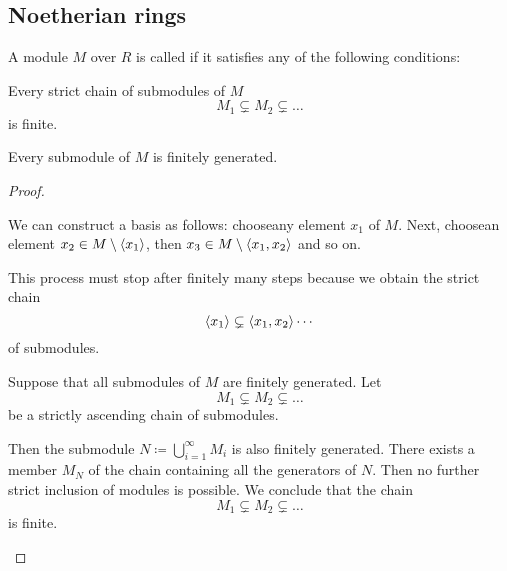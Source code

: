 \subsection{Noetherian rings}\label{subsec:noetherian_rings}

\begin{definition}\label{def:noetherian_module}\cite[proposition 8.30]{Knapp2016BAlg}
  A module \( M \) over \( R \) is called  if it satisfies any of the following conditions:
  \begin{defenum}
     Every strict chain of submodules of \( M \)
    \begin{equation*}
      M_1 \subsetneq M_2 \subsetneq \ldots
    \end{equation*}
    is finite.

     Every submodule of \( M \) is finitely generated.
  \end{defenum}
\end{definition}
\begin{proof}
  \begin{description}
     We can construct a basis as follows: choose\AOC any element \( x_1 \) of \( M \). Next, choose\AOC an element \( x_2 \in M \setminus \left\langle x_1 \right\rangle \), then \( x_3 \in M \setminus \left\langle x_1, x_2 \right\rangle \) and so on.

    This process must stop after finitely many steps because we obtain the strict chain
    \begin{equation*}
      \left\langle x_1 \right\rangle \subsetneq \left\langle x_1, x_2 \right\rangle \cdots
    \end{equation*}
    of submodules.

     Suppose that all submodules of \( M \) are finitely generated. Let
    \begin{equation*}
      M_1 \subsetneq M_2 \subsetneq \ldots
    \end{equation*}
    be a strictly ascending chain of submodules.

    Then the submodule \( N \coloneqq \bigcup_{i=1}^\infty M_i \) is also finitely generated. There exists a member \( M_N \) of the chain containing all the generators of \( N \). Then no further strict inclusion of modules is possible. We conclude that the chain
    \begin{equation*}
      M_1 \subsetneq M_2 \subsetneq \ldots
    \end{equation*}
    is finite.
  \end{description}
\end{proof}

